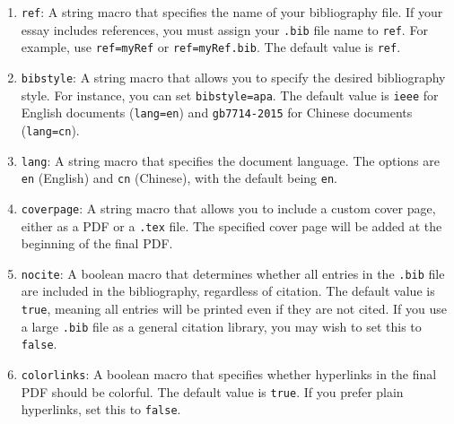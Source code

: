     \begin{enumerate}
        \item\texttt{ref}: A string macro that specifies the name of your bibliography file. If your essay includes references, you must assign your \texttt{.bib} file name to \texttt{ref}. For example, use \texttt{ref=myRef} or \texttt{ref=myRef.bib}. The default value is \texttt{ref}.
        \item\texttt{bibstyle}: A string macro that allows you to specify the desired bibliography style. For instance, you can set \texttt{bibstyle=apa}. The default value is \texttt{ieee} for English documents (\texttt{lang=en}) and \texttt{gb7714-2015} for Chinese documents (\texttt{lang=cn}).
        \item\texttt{lang}: A string macro that specifies the document language. The options are \texttt{en} (English) and \texttt{cn} (Chinese), with the default being \texttt{en}.
        \item\texttt{coverpage}: A string macro that allows you to include a custom cover page, either as a PDF or a \texttt{.tex} file. The specified cover page will be added at the beginning of the final PDF.
        \item\texttt{nocite}: A boolean macro that determines whether all entries in the \texttt{.bib} file are included in the bibliography, regardless of citation. The default value is \texttt{true}, meaning all entries will be printed even if they are not cited. If you use a large \texttt{.bib} file as a general citation library, you may wish to set this to \texttt{false}.
        \item\texttt{colorlinks}: A boolean macro that specifies whether hyperlinks in the final PDF should be colorful. The default value is \texttt{true}. If you prefer plain hyperlinks, set this to \texttt{false}.
    \end{enumerate}

